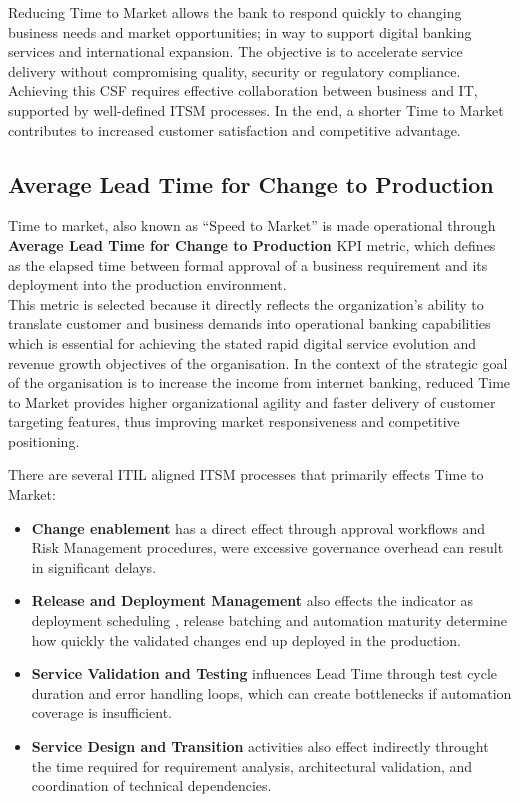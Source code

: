 Reducing Time to Market allows the bank to respond quickly to changing business needs and market opportunities; in way to support digital banking services and international expansion. The objective is to accelerate service delivery without compromising quality, security or regulatory compliance.\\
Achieving this CSF requires effective collaboration between business and IT, supported by well-defined ITSM processes. In the end, a shorter Time to Market contributes to increased customer satisfaction and competitive advantage.



\subsection{Average Lead Time for Change to Production}
\label{sub:AverageLeadTime}
Time to market, also known as ``Speed to Market'' is made operational through \textbf{Average Lead Time for Change to Production} KPI metric, which defines as the elapsed time between formal approval of a business requirement and its deployment into the production environment. \\
This metric is selected because it directly reflects the organization's ability to translate customer and business demands into operational banking capabilities which is essential for achieving the stated rapid digital service evolution and revenue growth objectives of the organisation. In the context of the strategic goal of the organisation is to increase the income from internet banking, reduced Time to Market provides higher organizational agility and faster delivery of customer targeting features, thus improving market responsiveness and competitive positioning.

There are several ITIL aligned ITSM processes that primarily effects Time to Market:

\begin{itemize}
    \item \textbf{Change enablement} has a direct effect through approval workflows and Risk Management procedures, were excessive governance overhead can result in significant delays.
    \item \textbf{Release and Deployment Management} also effects the indicator  as deployment scheduling , release batching and automation maturity determine how quickly the validated changes end up deployed in the production.
    \item \textbf{Service Validation and Testing} influences Lead Time through test cycle duration and error handling loops, which can create bottlenecks if automation coverage is insufficient.
    \item \textbf{Service Design and Transition} activities also effect indirectly throught the time required for requirement analysis, architectural validation, and coordination of technical dependencies.
\end{itemize}

